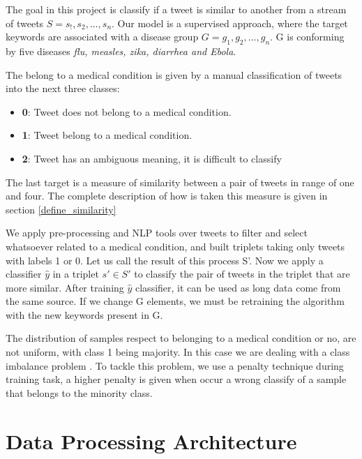 \documentclass[12pt]{report}
\begin{document}
The goal in this project is classify if a tweet is similar to another from a stream of tweets $S = {s_!, s_2, … , s_n}$. Our model is a supervised approach, where the target keywords are associated with a disease group $G = {g_1, g_2, …, g_n}$. G is conforming by five diseases \textit{flu, measles, zika, diarrhea and Ebola}.

The belong to a medical condition is given by a manual classification of tweets into the next three classes:

\begin{itemize}[nolistsep]
	\item \textbf{0}: Tweet does not belong to a medical condition.
	\item  \textbf{1}: Tweet belong to a medical condition.
	\item \textbf{2}: Tweet has an ambiguous meaning, it is difficult to classify 
\end{itemize}

The last target is a measure of similarity between a pair of tweets in range of one and four. The complete description of how is taken this measure is given in section \ref{define_similarity}

We apply pre-processing and \ac{NLP} tools over tweets to filter and select whatsoever related to a medical condition, and built triplets taking only tweets with labels 1 or 0. Let us call the result of this process S'. Now we apply a classifier $\hat{y}$ in a triplet $s' \in S'$ to classify the pair of tweets in the triplet that are more similar. After training $\hat{y}$ classifier, it can be used as long data come from the same source. If we change G elements, we must be retraining the algorithm with the new keywords present in G.

The distribution of samples respect to belonging to a medical condition or no, are not uniform, with class 1 being majority. In this case we are dealing with a class imbalance problem \cite{Batista2004} \cite{He2009}. To tackle this problem, we use a penalty technique during training task, a higher penalty is given when occur a wrong classify of a sample that belongs to the minority class.

\section{Data Processing Architecture}
\end{document}
